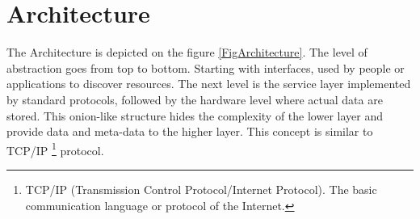 

\section{Architecture}

 
The Architecture is depicted on the figure \ref{FigArchitecture}. The
level of abstraction goes from top to bottom. Starting with
interfaces, used by people or applications to discover resources.  The
next level is the service layer implemented by standard protocols,
followed by the hardware level where actual data are stored. This
onion-like structure hides the complexity of the lower layer and
provide data and meta-data to the higher layer. This concept is
similar to TCP/IP \footnote{TCP/IP (Transmission Control
  Protocol/Internet Protocol).  The basic communication language or
  protocol of the Internet.}  protocol.

